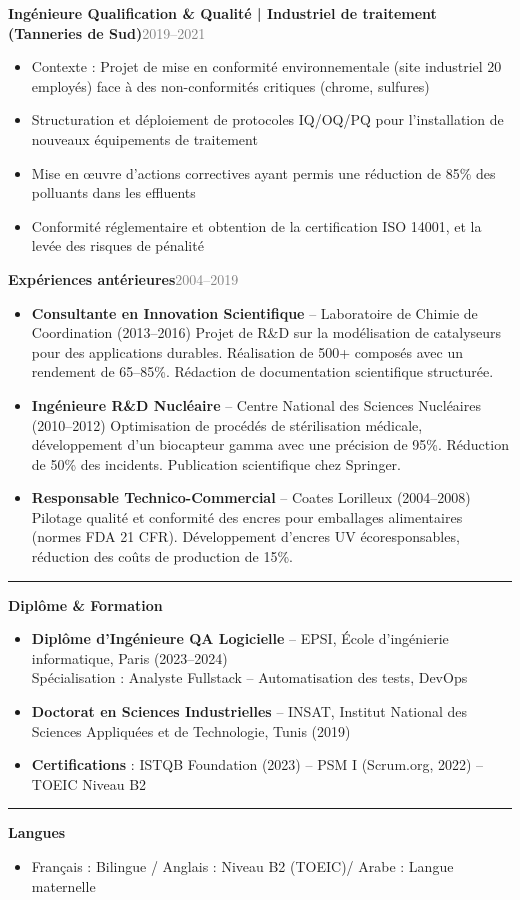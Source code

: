 \documentclass[11pt,a4paper]{article}
\newcommand{\cvsection}[1]{%
  \vspace{0pt}
  \noindent
  \textcolor{accentcolor}{\rule{2cm}{1.5pt}}\hspace{0.5em}
  {\large\bfseries\color{accentcolor}#1}
  \vspace{0.5em}
  \par\nobreak
}
\newenvironment{experience}[2]{%
  \vspace{0.1em}
  \noindent\textbf{\color{accentcolor}#1}\hfill\textcolor{graytext}{#2}
  \vspace{-0.1em}
  \begin{itemize}
}{%
  \end{itemize}
  \vspace{0.1em}
}
\begin{document}
 \begin{experience}{Ingénieure Qualification \& Qualité | Industriel de traitement (Tanneries de Sud)}{2019--2021}
  \item Contexte : Projet de mise en conformité environnementale (site industriel 20 employés) face à des non-conformités critiques (chrome, sulfures)
  \item Structuration et déploiement de protocoles IQ/OQ/PQ pour l’installation de nouveaux équipements de traitement
  \item Mise en œuvre d’actions correctives ayant permis une réduction de 85\% des polluants dans les effluents
  \item Conformité réglementaire et obtention de la certification ISO 14001, et la levée des risques de pénalité
  \end{experience}
\begin{experience}{Expériences antérieures}{2004--2019}

\item \textbf{Consultante en Innovation Scientifique} -- Laboratoire de Chimie de Coordination (2013--2016)  
Projet de R\&D sur la modélisation de catalyseurs pour des applications durables. Réalisation de 500+ composés avec un rendement de 65--85\%. Rédaction de documentation scientifique structurée.

\item \textbf{Ingénieure R\&D Nucléaire} -- Centre National des Sciences Nucléaires (2010--2012)  
Optimisation de procédés de stérilisation médicale, développement d’un biocapteur gamma avec une précision de 95\%. Réduction de 50\% des incidents. Publication scientifique chez Springer.

\item \textbf{Responsable Technico-Commercial} -- Coates Lorilleux (2004--2008)  
Pilotage qualité et conformité des encres pour emballages alimentaires (normes FDA 21 CFR). Développement d’encres UV écoresponsables, réduction des coûts de production de 15\%.

\end{experience}
\cvsection{Diplôme \& Formation}
\begin{itemize}
    \item \textbf{Diplôme d’Ingénieure QA Logicielle} -- EPSI, École d’ingénierie informatique, Paris (2023--2024)\\
    Spécialisation : Analyste Fullstack -- Automatisation des tests, DevOps

    \item \textbf{Doctorat en Sciences Industrielles} -- INSAT, Institut National des Sciences Appliquées et de Technologie, Tunis (2019)

    \item \textbf{Certifications} : ISTQB Foundation (2023) -- PSM I (Scrum.org, 2022) -- TOEIC Niveau B2
\end{itemize}


\cvsection{Langues}
\begin{itemize}
  \item Français : Bilingue / Anglais : Niveau B2 (TOEIC)/ Arabe : Langue maternelle
\end{itemize}
\end{document}
